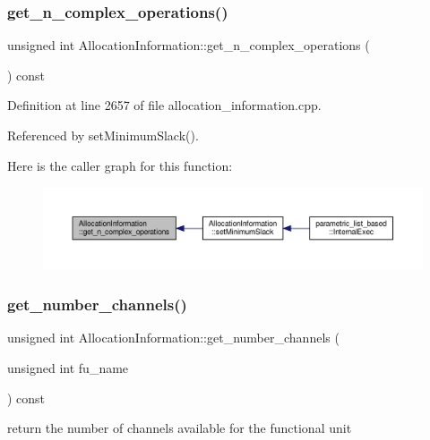 \subsubsection{\texorpdfstring{get\+\_\+n\+\_\+complex\+\_\+operations()}{get\_n\_complex\_operations()}}
{\footnotesize\ttfamily unsigned int Allocation\+Information\+::get\+\_\+n\+\_\+complex\+\_\+operations (\begin{DoxyParamCaption}{ }\end{DoxyParamCaption}) const}



Definition at line 2657 of file allocation\+\_\+information.\+cpp.



Referenced by set\+Minimum\+Slack().

Here is the caller graph for this function\+:
\nopagebreak
\begin{figure}[H]
\begin{center}
\leavevmode
\includegraphics[width=350pt]{d7/d79/classAllocationInformation_a8468ee7208e4d231c58e7c82e4a8a9aa_icgraph}
\end{center}
\end{figure}
\mbox{\label{classAllocationInformation_af0d620492405831a57abd8dc83eac3fc}} 
\subsubsection{\texorpdfstring{get\+\_\+number\+\_\+channels()}{get\_number\_channels()}}
{\footnotesize\ttfamily unsigned int Allocation\+Information\+::get\+\_\+number\+\_\+channels (\begin{DoxyParamCaption}\item[{unsigned int}]{fu\+\_\+name }\end{DoxyParamCaption}) const}



return the number of channels available for the functional unit 


